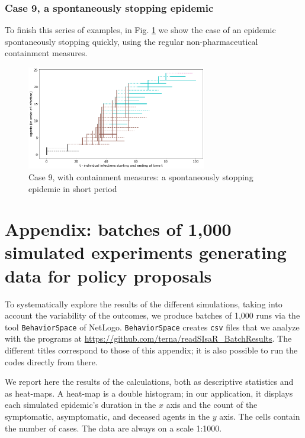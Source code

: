 \documentclass[11pt]{article}
\begin{document}
\subsubsection{Case 9, a spontaneously stopping epidemic}
\label{c9}

To finish this series of examples, in Fig. \ref{2} we show the case of an epidemic spontaneously stopping quickly, using the regular non-pharmaceutical containment measures.

\begin{figure}[H]
\begin{center}
\includegraphics[width=0.7\textwidth]{withShort2.png}%
\caption{Case 9, with containment measures: a spontaneously stopping epidemic in  short period}
\label{2}
\end{center}
\end{figure}



\section{Appendix: batches of 1,000 simulated experiments generating data for policy proposals}
\label{app1000run}

To systematically explore the results of the different simulations, taking into account the variability of the outcomes, we produce batches of 1,000 runs via the tool \verb|BehaviorSpace| of NetLogo. \verb|BehaviorSpace| creates \verb|csv| files that we analyze with the programs at 
\url{https://github.com/terna/readSIsaR_BatchResults}. The different titles correspond to those of this appendix; it is also possible to run the codes directly from there.

We report here the results of the calculations, both as descriptive statistics and as heat-maps. A heat-map is a double histogram; in our application, it displays each simulated epidemic's duration in the $x$ axis and the count of the symptomatic, asymptomatic, and deceased agents in the $y$ axis. The cells contain the number of cases. The data are always on a scale 1:1000.
\end{document}
